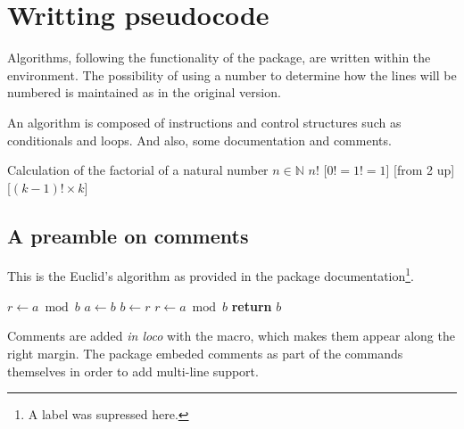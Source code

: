 \documentclass[a4paper, 11pt]{article}
\begin{document}
\section{Writting pseudocode}
Algorithms, following the functionality of the  package, are written within the  environment. The possibility of using a number to determine how the lines will be numbered is maintained as in the original version.

An algorithm is composed of instructions and control structures such as conditionals and loops. And also, some documentation and comments.

\begin{tcblisting}{}
    \begin{algorithmic}
        \Description Calculation of the factorial of a natural number
        \Input $n \in \mathbb{N}$
        \Output $n!$
        \Statex
        [$0! = 1! = 1$]
        [from 2 up]
            [$(k-1)! \times k$]
        \EndFor
    \end{algorithmic}
\end{tcblisting}

\subsection{A preamble on comments}\label{sec:a-preamble-on-comments}
This is the Euclid's algorithm as provided in the  package documentation\footnote{A label was supressed here.}.

\begingroup
\begin{tcblisting}{}
    \begin{algorithmic}[1]
            \State $r\gets a\bmod b$
                \State $a\gets b$
                \State $b\gets r$
                \State $r\gets a\bmod b$
            \EndWhile
            \State \textbf{return} $b$
        \EndProcedure
    \end{algorithmic}
\end{tcblisting}
\endgroup

Comments are added \textit{in loco} with the  macro, which makes them appear along the right margin. The  package embeded comments as part of the commands themselves in order to add multi-line support.
\end{document}
